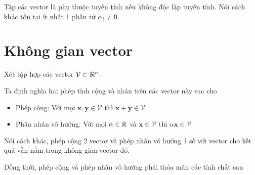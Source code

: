 \begin{definition}
    Tập các vector là phụ thuộc tuyến tính nếu không độc lập tuyến tính.
    Nói cách khác tồn tại ít nhất 1 phần tử $\alpha_i \neq 0$.
\end{definition}

\section{Không gian vector}

Xét tập hợp các vector $\mathcal{V} \subset \mathbb{R}^n$.

Ta định nghĩa hai phép tính cộng và nhân trên các vector này sao cho

\begin{itemize}[noitemsep]
    \item Phép cộng: Với mọi $\bm{x}, \bm{y} \in \mathcal{V}$ thì $\bm{x} + \bm{y} \in \mathcal{V}$
    \item Phân nhân vô hướng: Với mọi $\alpha \in \mathbb{R}$ và $\bm{x} \in \mathcal{V}$ thì $\alpha \bm{x} \in \mathcal{V}$
\end{itemize}

Nói cách khác, phép cộng 2 vector và phép nhân vô hướng 1 số với vector cho kết quả vẫn nằm trong không gian vector đó.

Đồng thời, phép cộng và phép nhân vô hướng phải thỏa mãn các tính chất sau


